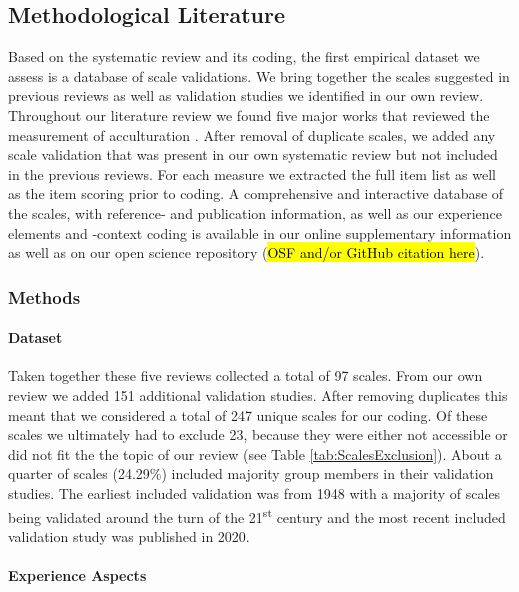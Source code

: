 

\subsection{Methodological Literature}

Based on the systematic review and its coding, the first empirical
dataset we assess is a database of scale validations. We bring together
the scales suggested in previous reviews as well as validation studies
we identified in our own review. Throughout our literature review we
found five major works that reviewed the measurement of acculturation
\citep{Celenk2011, Maestas2000, Matsudaira2006, Wallace2010, Zane2004}.
After removal of duplicate scales, we added any scale validation that
was present in our own systematic review but not included in the
previous reviews. For each measure we extracted the full item list as
well as the item scoring prior to coding. A comprehensive and
interactive database of the scales, with reference- and publication
information, as well as our experience elements and -context coding is
available in our online supplementary information as well as on our open
science repository (\hl{OSF and/or GitHub citation here}).

\subsubsection{Methods}  
\paragraph{Dataset}
Taken together these five reviews collected a total of 97 scales. From
our own review we added 151 additional validation studies. After
removing duplicates this meant that we considered a total of 247 unique
scales for our coding. Of these scales we ultimately had to exclude 23,
because they were either not accessible or did not fit the the topic of
our review (see Table \ref{tab:ScalesExclusion}). About a quarter of
scales (24.29\%) included majority group members in their validation
studies. The earliest included validation was from 1948 with a majority
of scales being validated around the turn of the 21\textsuperscript{st}
century and the most recent included validation study was published in
2020.

\paragraph{Experience Aspects}

